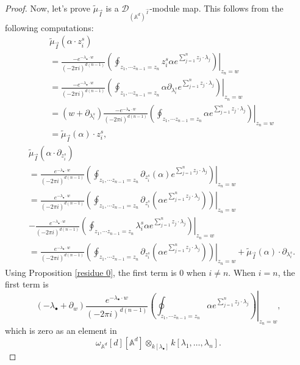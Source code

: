 \documentclass[11pt]{amsart}
\theoremstyle{definition}
\theoremstyle{remark}
\numberwithin{equation}{section}
\begin{document}
\begin{proof}
    Now, let's prove $\tilde{\mu}_{\vec{I}}$ is a $\mathcal{D}_{(\mathbb{A}^{d})^{\vec{I}}}$-module map. This follows from the following computations:
    \begin{align*}
        &\tilde{\mu}_{\vec{I}}(\alpha\cdot z_{i}^{s})\\
        &=
        \frac{-e^{-\lambda_{\bullet}\cdot w}}{(-2\pi i)^{d(n-1)}}\left.\left(\oint_{z_{1},\cdots z_{n-1}=z_{n}}z_{i}^{s}\alpha e^{\sum_{j=1}^{n}z_{j}\cdot \lambda_{j}}\right)\right|_{z_n=w}\\
        &=
        \frac{-e^{-\lambda_{\bullet}\cdot w}}{(-2\pi i)^{d(n-1)}}\left.\left(\oint_{z_{1},\cdots z_{n-1}=z_{n}}\alpha \partial_{\lambda_{i}^{s}}e^{\sum_{j=1}^{n}z_{j}\cdot \lambda_{j}}\right)\right|_{z_n=w}\\
        &=(w+\partial_{\lambda_{i}^{s}})\frac{-e^{-\lambda_{\bullet}\cdot w}}{(-2\pi i)^{d(n-1)}}\left.\left(\oint_{z_{1},\cdots z_{n-1}=z_{n}}\alpha e^{\sum_{j=1}^{n}z_{j}\cdot \lambda_{j}}\right)\right|_{z_n=w}\\
        &=
        \tilde{\mu}_{\vec{I}}(\alpha)\cdot z_{i}^{s},
    \end{align*}
    \begin{align*}
        &\tilde{\mu}_{\vec{I}}(\alpha\cdot \partial_{z_{i}^{s}})\\
        &=
        \frac{e^{-\lambda_{\bullet}\cdot w}}{(-2\pi i)^{d(n-1)}}\left.\left(\oint_{z_{1},\cdots z_{n-1}=z_{n}}\partial_{z_{i}^{s}}(\alpha) e^{\sum_{j=1}^{n}z_{j}\cdot \lambda_{j}}\right)\right|_{z_n=w}\\
        &=
        \frac{e^{-\lambda_{\bullet}\cdot w}}{(-2\pi i)^{d(n-1)}}\left.\left(\oint_{z_{1},\cdots z_{n-1}=z_{n}}\partial_{z_{i}^{s}}(\alpha e^{\sum_{j=1}^{n}z_{j}\cdot \lambda_{j}})\right)\right|_{z_n=w}\\
        &-
        \frac{e^{-\lambda_{\bullet}\cdot w}}{(-2\pi i)^{d(n-1)}}\left.\left(\oint_{z_{1},\cdots z_{n-1}=z_{n}}\lambda_{i}^{s}\alpha e^{\sum_{j=1}^{n}z_{j}\cdot \lambda_{j}}\right)\right|_{z_n=w}\\
        &=
        \frac{e^{-\lambda_{\bullet}\cdot w}}{(-2\pi i)^{d(n-1)}}\left.\left(\oint_{z_{1},\cdots z_{n-1}=z_{n}}\partial_{z_{i}^{s}}(\alpha e^{\sum_{j=1}^{n}z_{j}\cdot \lambda_{j}})\right)\right|_{z_n=w}+
        \tilde{\mu}_{\vec{I}}(\alpha)\cdot \partial_{\lambda_{i}^{s}}.
    \end{align*}
    Using Proposition \ref{residue 0}, the first term is $0$ when $i\neq n$. When $i=n$, the first term is
    $$
    (-\lambda_{\bullet}+\partial_{w})\frac{e^{-\lambda_{\bullet}\cdot w}}{(-2\pi i)^{d(n-1)}}\left.\left(\oint_{z_{1},\cdots z_{n-1}=z_{n}}\alpha e^{\sum_{j=1}^{n}z_{j}\cdot \lambda_{j}}\right)\right|_{z_n=w},
    $$
    which is zero as an element in
    $$
    \omega_{\mathbb{A}^{d}}[d][\mathbb{A}^{d}]\otimes_{k[\lambda_{\bullet}]}k[\lambda_{1},\dots,\lambda_{n}].
    $$
\end{proof}
\end{document}

